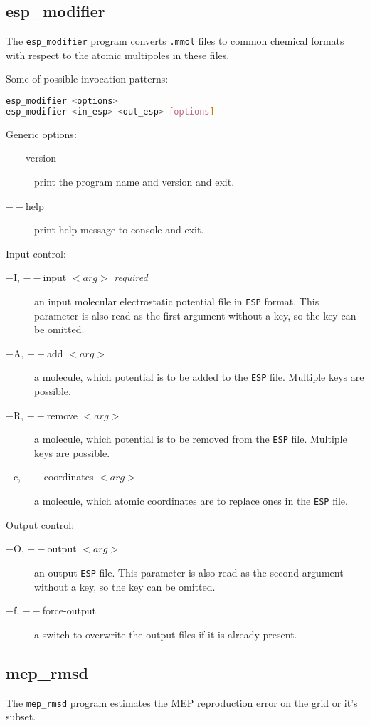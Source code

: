 \documentclass[10pt,a4paper]{article}
\begin{document}
\subsection{esp\_modifier}
The \lstinline{esp_modifier} program converts \lstinline{.mmol} files to common chemical
formats with respect to the atomic multipoles in these files.

Some of possible invocation patterns:
\begin{lstlisting}[language=bash]
esp_modifier <options>
esp_modifier <in_esp> <out_esp> [options]
\end{lstlisting}

Generic options:
\begin{description}
\item[$--$version] print the program name and version and exit.
\item[$--$help] print help message to console and exit.
\end{description}

Input control:
\begin{description}
\item[$-$I, $--$input $<arg>$ \textit{required}] an input molecular electrostatic 
potential file in \lstinline{ESP} format.
This parameter is also read as the first argument without 
a key, so the key can be omitted.
\item[$-$A, $--$add $<arg>$] a molecule, which potential is to be added to the 
\lstinline{ESP} file. Multiple keys are possible.
\item[$-$R, $--$remove $<arg>$] a molecule, which potential is to be removed from
the \lstinline{ESP} file. Multiple keys are possible.
\item[$-$c, $--$coordinates $<arg>$] a molecule, which atomic coordinates are to 
replace ones in the \lstinline{ESP} file.
\end{description}

Output control:
\begin{description}
\item[$-$O, $--$output $<arg>$] an output \lstinline{ESP} file. This parameter is also read as the
second argument without a key, so the key can be omitted. 
\item[$-$f, $--$force-output] a switch to overwrite the output files if it is
already present.
\end{description}

\subsection{mep\_rmsd}
The \lstinline{mep_rmsd} program estimates the MEP reproduction error on the grid
or it's subset.
\end{document}

